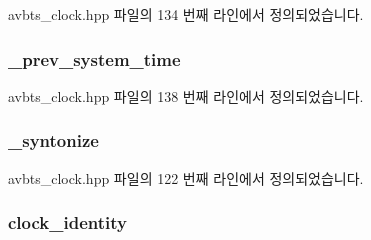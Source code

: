 avbts\+\_\+clock.\+hpp 파일의 134 번째 라인에서 정의되었습니다.

\subsubsection[{\texorpdfstring{\+\_\+prev\+\_\+system\+\_\+time}{_prev_system_time}}]{ \+\_\+prev\+\_\+system\+\_\+time\hspace{0.3cm}{\ttfamily [private]}}\hypertarget{class_i_e_e_e1588_clock_a41e7bda38ca1214821d6ebf5164aea96}{}\label{class_i_e_e_e1588_clock_a41e7bda38ca1214821d6ebf5164aea96}


avbts\+\_\+clock.\+hpp 파일의 138 번째 라인에서 정의되었습니다.

\subsubsection[{\texorpdfstring{\+\_\+syntonize}{_syntonize}}]{ \+\_\+syntonize\hspace{0.3cm}{\ttfamily [private]}}\hypertarget{class_i_e_e_e1588_clock_a0622d210cf26a0695cf8bd6fa01fb46b}{}\label{class_i_e_e_e1588_clock_a0622d210cf26a0695cf8bd6fa01fb46b}


avbts\+\_\+clock.\+hpp 파일의 122 번째 라인에서 정의되었습니다.

\subsubsection[{\texorpdfstring{clock\+\_\+identity}{clock_identity}}]{ clock\+\_\+identity\hspace{0.3cm}{\ttfamily [private]}}\hypertarget{class_i_e_e_e1588_clock_a8f1bca06e21478283b96e81ef3ba266a}{}\label{class_i_e_e_e1588_clock_a8f1bca06e21478283b96e81ef3ba266a}



